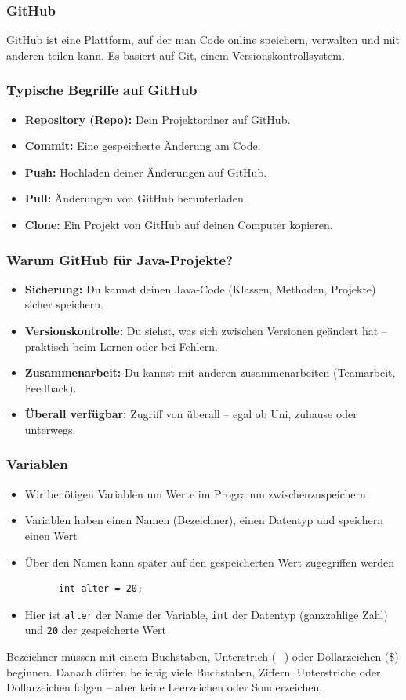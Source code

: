 \documentclass{../../presentation}
\begin{document}
\begin{frame}
  \frametitle{GitHub}
  GitHub ist eine Plattform, auf der man Code online speichern, verwalten und mit anderen teilen kann. Es basiert auf Git, einem Versionskontrollsystem.
\end{frame}

\begin{frame}
  \frametitle{Typische Begriffe auf GitHub}
  \begin{itemize}
    \item \textbf{Repository (Repo):} Dein Projektordner auf GitHub.
    \item \textbf{Commit:} Eine gespeicherte Änderung am Code.
    \item \textbf{Push:} Hochladen deiner Änderungen auf GitHub.
    \item \textbf{Pull:} Änderungen von GitHub herunterladen.
    \item \textbf{Clone:} Ein Projekt von GitHub auf deinen Computer kopieren.
  \end{itemize}
\end{frame}

\begin{frame}
  \frametitle{Warum GitHub für Java-Projekte?}
  \begin{itemize}
    \item \textbf{Sicherung:} Du kannst deinen Java-Code (Klassen, Methoden, Projekte) sicher speichern.
    \item \textbf{Versionskontrolle:} Du siehst, was sich zwischen Versionen geändert hat – praktisch beim Lernen oder bei Fehlern.
    \item \textbf{Zusammenarbeit:} Du kannst mit anderen zusammenarbeiten (Teamarbeit, Feedback).
    \item \textbf{Überall verfügbar:} Zugriff von überall – egal ob Uni, zuhause oder unterwegs.
  \end{itemize}
\end{frame}

\begin{frame}[fragile]
  \frametitle{Variablen}
  \begin{itemize}
    \item Wir benötigen Variablen um Werte im Programm zwischenzuspeichern
    \item Variablen haben einen Namen (Bezeichner), einen Datentyp und speichern einen Wert
    \item Über den Namen kann später auf den gespeicherten Wert zugegriffen werden
          \begin{verbatim}
      int alter = 20;
    \end{verbatim}
    \item Hier ist \texttt{alter} der Name der Variable, \texttt{int} der Datentyp (ganzzahlige Zahl) und \texttt{20} der gespeicherte Wert
  \end{itemize}
  \achtung{} Bezeichner müssen mit einem Buchstaben, Unterstrich (\_) oder Dollarzeichen (\$) beginnen.
  Danach dürfen beliebig viele Buchstaben, Ziffern, Unterstriche oder Dollarzeichen folgen -- aber keine Leerzeichen oder Sonderzeichen.
\end{frame}
\end{document}

